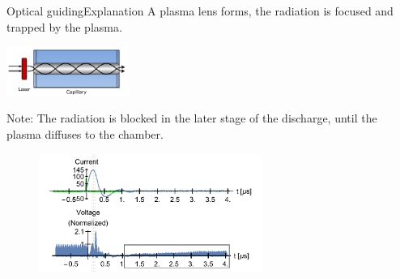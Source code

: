 \documentclass[dvipsnames]{beamer}
\begin{document}
  \begin{frame}{Optical guiding}{Explanation}
    {\footnotesize A plasma lens forms, the radiation is focused and trapped by the plasma.}
    \begin{center}
      \includegraphics[width=0.3\textwidth]{figures/results/oscillator/chen_4_31.pdf}
    \end{center}
    {\footnotesize Note: The radiation is blocked in the later stage of the discharge, until the plasma diffuses to the chamber.}
    \begin{figure}
      \includegraphics[width=0.65\textwidth]{figures/results/oscillator/guiding_gray.pdf}
    \end{figure}
  \end{frame}
\end{document}
